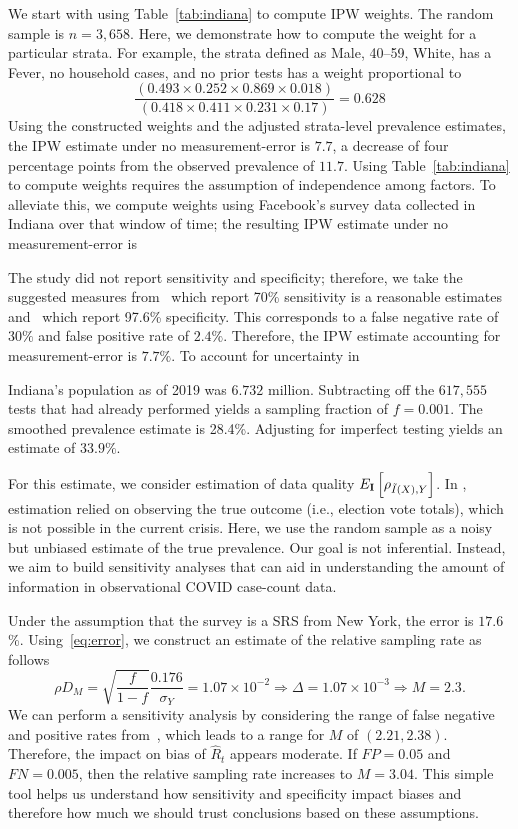 \documentclass[12pt]{amsart}
\numberwithin{equation}{section}
\theoremstyle{plain}
\def\I{\bf I}
\begin{document}
We start with using Table~\ref{tab:indiana} to compute IPW weights.  The random sample is $n=3,658$.  Here, we demonstrate how to compute the weight for a particular strata.  For example, the strata defined as Male, 40--59, White, has a Fever, no household cases, and no prior tests has a weight proportional to
$$
\frac{\left( 0.493 \times 0.252 \times 0.869 \times 0.018 \right)}{\left(0.418 \times 0.411 \times 0.231 \times 0.17 \right)} = 0.628
$$
Using the constructed weights and the adjusted strata-level prevalence estimates, the IPW estimate under no measurement-error is $7.7$, a decrease of four percentage points from the observed prevalence of $11.7$. Using Table~\ref{tab:indiana} to compute weights requires the assumption of independence among factors.  To alleviate this, we compute weights using Facebook's survey data collected in Indiana over that window of time; the resulting IPW estimate under no measurement-error is

The study did not report sensitivity and specificity; therefore, we take the suggested measures from~\cite{Woloshin2020} which report 70\% sensitivity is a reasonable estimates and~\cite{Cohen2020} which report 97.6\% specificity.  This corresponds to a false negative rate of $30\%$ and false positive rate of $2.4\%$.  Therefore, the IPW estimate accounting for measurement-error is $7.7\%$.  To account for uncertainty in

Indiana's population as of 2019 was $6.732$ million.  Subtracting off the $617,555$ tests that had already performed yields a sampling fraction of $f = 0.001$.  The smoothed prevalence estimate is 28.4\%.  Adjusting for imperfect testing yields an estimate of $33.9\%$.



For this estimate, we consider estimation of data quality $E_{\I} \left[ \rho_{\tilde I(X),Y} \right]$. In \cite{Meng2018}, estimation relied on observing the true outcome (i.e., election vote totals), which is not possible in the current crisis.  Here, we use the random sample as a noisy but unbiased estimate of the true prevalence. Our goal is not inferential. Instead, we aim to build sensitivity analyses that can aid in understanding the amount of information in observational COVID case-count data.


Under the assumption that the survey is a SRS from New York, the error is $17.6$\%.  Using~\eqref{eq:error}, we construct an estimate of the relative sampling rate as follows
\[
\rho D_M = \sqrt{\frac{f}{1-f}} \frac{\text{0.176}}{\sigma_Y} = 1.07 \times 10^{-2} \Rightarrow \Delta = 1.07 \times 10^{-3} \Rightarrow M = 2.3.
\]
We can perform a sensitivity analysis by considering the range of false negative and positive rates from~\cite{Bendavid2020}, which leads to a range for $M$ of $(2.21, 2.38)$.  Therefore, the impact on bias of $\hat R_t$ appears moderate.  If $FP = 0.05$ and $FN = 0.005$, then the relative sampling rate increases to $M=3.04$.  This simple tool helps us understand how sensitivity and specificity impact biases and  therefore how much we should trust conclusions based on these assumptions.
\end{document}
